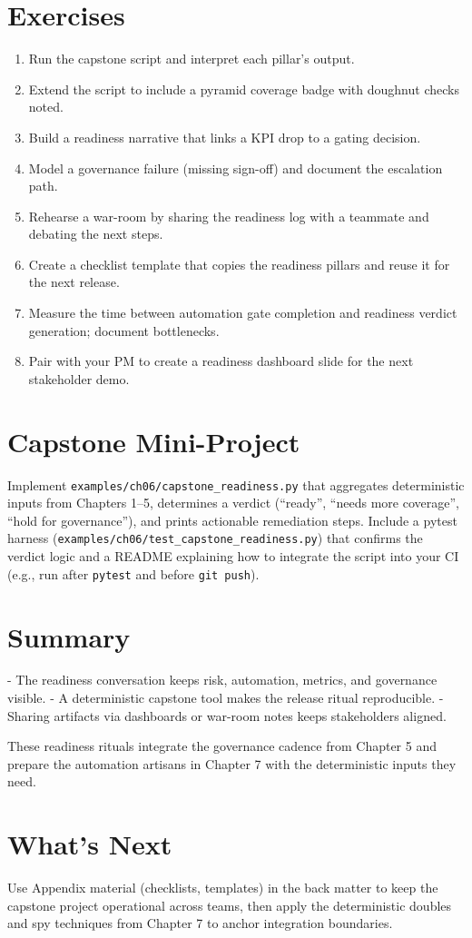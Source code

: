 \section{Exercises}

\begin{enumerate}
  \item Run the capstone script and interpret each pillar’s output.
  \item Extend the script to include a pyramid coverage badge with doughnut checks noted.
  \item Build a readiness narrative that links a KPI drop to a gating decision.
  \item Model a governance failure (missing sign-off) and document the escalation path.
  \item Rehearse a war-room by sharing the readiness log with a teammate and debating the next steps.
  \item Create a checklist template that copies the readiness pillars and reuse it for the next release.
  \item Measure the time between automation gate completion and readiness verdict generation; document bottlenecks.
  \item Pair with your PM to create a readiness dashboard slide for the next stakeholder demo.
\end{enumerate}

\section{Capstone Mini-Project}

Implement \texttt{examples/ch06/capstone\_readiness.py} that aggregates deterministic inputs from Chapters 1–5, determines a verdict (“ready”, “needs more coverage”, “hold for governance”), and prints actionable remediation steps. Include a pytest harness (\texttt{examples/ch06/test\_capstone\_readiness.py}) that confirms the verdict logic and a README explaining how to integrate the script into your CI (e.g., run after \texttt{pytest} and before \texttt{git push}).

\section{Summary}

- The readiness conversation keeps risk, automation, metrics, and governance visible.
- A deterministic capstone tool makes the release ritual reproducible.
- Sharing artifacts via dashboards or war-room notes keeps stakeholders aligned.

These readiness rituals integrate the governance cadence from Chapter 5 and prepare the automation artisans in Chapter 7 with the deterministic inputs they need.

\section{What's Next}

Use Appendix material (checklists, templates) in the back matter to keep the capstone project operational across teams, then apply the deterministic doubles and spy techniques from Chapter 7 to anchor integration boundaries.
